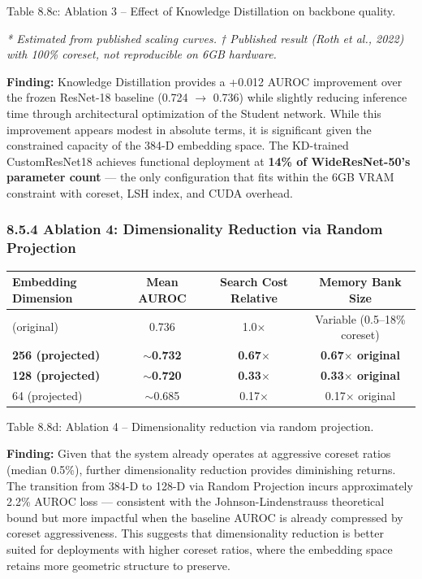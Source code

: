 \documentclass[12pt, a4paper, oneside]{report}
\begin{document}
Table 8.8c: Ablation 3 -- Effect of Knowledge Distillation on backbone quality.

\emph{* Estimated from published scaling curves. † Published result (Roth et al., 2022) with 100\% coreset, not reproducible on 6GB hardware.}

\textbf{Finding:} Knowledge Distillation provides a +0.012 AUROC improvement over the frozen ResNet-18 baseline (0.724 $\rightarrow$ 0.736) while slightly reducing inference time through architectural optimization of the Student network. While this improvement appears modest in absolute terms, it is significant given the constrained capacity of the 384-D embedding space. The KD-trained CustomResNet18 achieves functional deployment at \textbf{14\% of WideResNet-50's parameter count} --- the only configuration that fits within the 6GB VRAM constraint with coreset, LSH index, and CUDA overhead.

\subsubsection{8.5.4 Ablation 4: Dimensionality Reduction via Random Projection}\label{ablation-4-dimensionality-reduction-via-random-projection}

{\def\LTcaptype{none} %
\begin{longtable}[]{@{}lccc@{}}
\toprule\noalign{}
Embedding Dimension & Mean AUROC & Search Cost Relative & Memory Bank Size \\
\midrule\noalign{}
\endhead
\bottomrule\noalign{}
\endlastfoot
384 (original) & 0.736 & 1.0$\times$ & Variable (0.5--18\% coreset) \\
\textbf{256 (projected)} & \textbf{${\sim}$0.732} & \textbf{0.67$\times$} & \textbf{0.67$\times$ original} \\
\textbf{128 (projected)} & \textbf{${\sim}$0.720} & \textbf{0.33$\times$} & \textbf{0.33$\times$ original} \\
64 (projected) & ${\sim}$0.685 & 0.17$\times$ & 0.17$\times$ original \\
\end{longtable}
}

Table 8.8d: Ablation 4 -- Dimensionality reduction via random projection.

\textbf{Finding:} Given that the system already operates at aggressive coreset ratios (median 0.5\%), further dimensionality reduction provides diminishing returns. The transition from 384-D to 128-D via Random Projection incurs approximately 2.2\% AUROC loss --- consistent with the Johnson-Lindenstrauss theoretical bound but more impactful when the baseline AUROC is already compressed by coreset aggressiveness. This suggests that dimensionality reduction is better suited for deployments with higher coreset ratios, where the embedding space retains more geometric structure to preserve.
\end{document}
